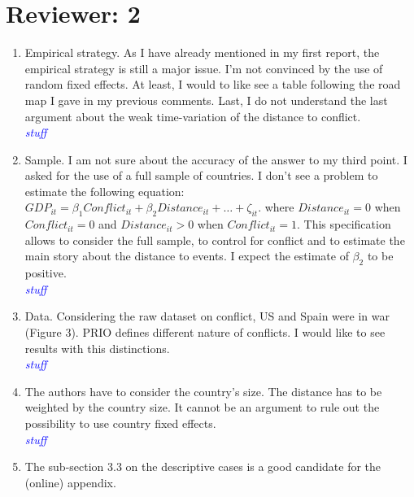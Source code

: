 \section*{Reviewer: 2}

\begin{enumerate}
\item   Empirical strategy. As I have already mentioned in my first report, the empirical strategy is still a
major issue. I’m not convinced by the use of random fixed effects. At least, I would to like see a
table following the road map I gave in my previous comments. Last, I do not understand the last
argument about the weak time-variation of the distance to conflict. \\

\textcolor{blue}{\emph{
	stuff
}}

\item Sample. I am not sure about the accuracy of the answer to my third point. I asked for the use of a
full sample of countries. I don’t see a problem to estimate the following equation: $GDP_{it} = \beta_{1}Conflict_{it} + \beta_{2}Distance_{it}+\ldots+\zeta_{it}$. where $Distance_{it}=0$ when $Conflict_{it}=0$ and $Distance_{it}>0$ when $Conflict_{it}=1$. This specification allows to consider the full sample, to control for conflict and to estimate the main story about the distance to events. I expect the estimate of $\beta_{2}$ to be positive. \\

\textcolor{blue}{\emph{
	stuff
}} 

\item Data. Considering the raw dataset on conflict, US and Spain were in war (Figure 3). PRIO defines different nature of conflicts. I would like to see results with this distinctions. \\

\textcolor{blue}{\emph{
	stuff
}}

\item The authors have to consider the country’s size. The distance has to be weighted by the country size. It cannot be an argument to rule out the possibility to use country fixed effects. \\

\textcolor{blue}{\emph{
	stuff
}}

\item The sub-section 3.3 on the descriptive cases is a good candidate for the (online) appendix. \\


\end{enumerate}
